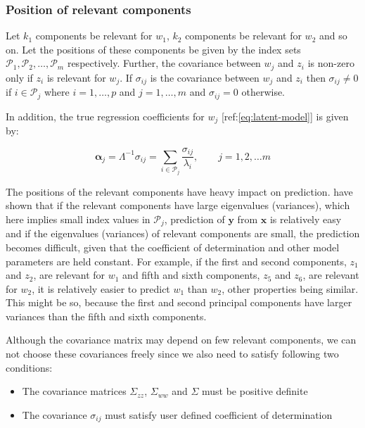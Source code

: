 \documentclass[review]{elsarticle}
\providecommand{\tightlist}{%
  \setlength{\itemsep}{0pt}\setlength{\parskip}{0pt}}
\theoremstyle{definition}
\theoremstyle{definition}
\theoremstyle{definition}
\theoremstyle{remark}
\begin{document}
\subsubsection{Position of relevant
components}\label{position-of-relevant-components}

Let \(k_1\) components be relevant for \(w_1\), \(k_2\) components be
relevant for \(w_2\) and so on. Let the positions of these components be
given by the index sets
\(\mathcal{P}_1, \mathcal{P}_2, \ldots, \mathcal{P}_m\) respectively.
Further, the covariance between \(w_j\) and \(z_i\) is non-zero only if
\(z_i\) is relevant for \(w_j\). If \(\sigma_{ij}\) is the covariance
between \(w_j\) and \(z_i\) then \(\sigma_{ij} \ne 0\) if
\(i \in \mathcal{P}_j\) where \(i = 1, \ldots, p\) and
\(j = 1, \ldots, m\) and \(\sigma_{ij} = 0\) otherwise.

In addition, the true regression coefficients for \(w_j\)
{[}ref:\eqref{eq:latent-model}{]} is given by:

\[
\boldsymbol{\alpha}_j = \Lambda^{-1} \sigma_{ij} = \sum_{i \in \mathcal{P}_j}\frac{\sigma_{ij}}{\lambda_i},\qquad j = 1, 2, \ldots m
\]

The positions of the relevant components have heavy impact on
prediction. \citet{helland1994comparison} have shown that if the
relevant components have large eigenvalues (variances), which here
implies small index values in \(\mathcal{P}_j\), prediction of
\(\mathbf{y}\) from \(\mathbf{x}\) is relatively easy and if the
eigenvalues (variances) of relevant components are small, the prediction
becomes difficult, given that the coefficient of determination and other
model parameters are held constant. For example, if the first and second
components, \(z_1\) and \(z_2\), are relevant for \(w_1\) and fifth and
sixth components, \(z_5\) and \(z_6\), are relevant for \(w_2\), it is
relatively easier to predict \(w_1\) than \(w_2\), other properties
being similar. This might be so, because the first and second principal
components have larger variances than the fifth and sixth components.

Although the covariance matrix may depend on few relevant components, we
can not choose these covariances freely since we also need to satisfy
following two conditions:

\begin{itemize}
\tightlist
\item
  The covariance matrices \(\Sigma_{zz}\), \(\Sigma_{ww}\) and
  \(\Sigma\) must be positive definite
\item
  The covariance \(\sigma_{ij}\) must satisfy user defined coefficient
  of determination
\end{itemize}
\end{document}
